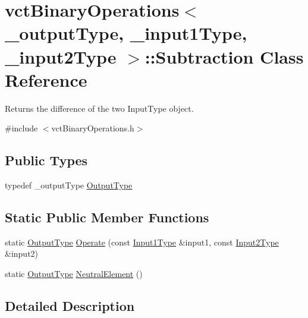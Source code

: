 \hypertarget{classvct_binary_operations_1_1_subtraction}{\section{vct\-Binary\-Operations$<$ \-\_\-output\-Type, \-\_\-input1\-Type, \-\_\-input2\-Type $>$\-:\-:Subtraction Class Reference}
\label{classvct_binary_operations_1_1_subtraction}
}


Returns the difference of the two Input\-Type object.  




{\ttfamily \#include $<$vct\-Binary\-Operations.\-h$>$}

\subsection*{Public Types}
\begin{DoxyCompactItemize}
\item 
typedef \-\_\-output\-Type \hyperlink{classvct_binary_operations_1_1_subtraction_acdf0aa04f6b08e9b6d199035f89071ff}{Output\-Type}
\end{DoxyCompactItemize}
\subsection*{Static Public Member Functions}
\begin{DoxyCompactItemize}
\item 
static \hyperlink{classvct_binary_operations_1_1_subtraction_acdf0aa04f6b08e9b6d199035f89071ff}{Output\-Type} \hyperlink{classvct_binary_operations_1_1_subtraction_a264fe1bd3f777894e0a50cf145b2df6d}{Operate} (const \hyperlink{classvct_binary_operations_a5e56a66a012d6a28c539a08a0021c45e}{Input1\-Type} \&input1, const \hyperlink{classvct_binary_operations_a929119af557a04a16b4d854981e49e1b}{Input2\-Type} \&input2)
\item 
static \hyperlink{classvct_binary_operations_1_1_subtraction_acdf0aa04f6b08e9b6d199035f89071ff}{Output\-Type} \hyperlink{classvct_binary_operations_1_1_subtraction_a6fa58511ec33d3d452708dc8b90300a3}{Neutral\-Element} ()
\end{DoxyCompactItemize}


\subsection{Detailed Description}
